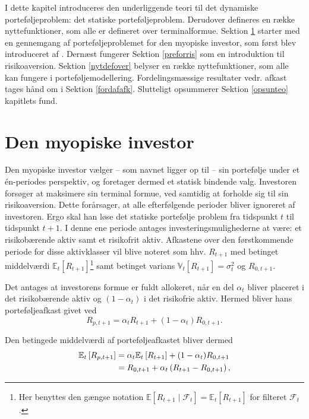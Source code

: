\documentclass[
  a4paper,
  oneside]{memoir}
\begin{document}
I dette kapitel introduceres den underliggende teori til det dynamiske porteføljeproblem: det statiske porteføljeproblem. Derudover defineres en række nyttefunktioner, som alle er defineret over terminalformue. Sektion \ref{myoinv} starter med en gennemgang af porteføljeproblemet for den myopiske investor, som først blev introduceret af \citep{Markowitz1952}. Dernæst fungerer Sektion \ref{preforris} som en introduktion til risikoaversion. Sektion \ref{nytdefover} belyser en række nyttefunktioner, som alle kan fungere i porteføljemodellering. Fordelingsmæssige resultater vedr. afkast tages hånd om i Sektion \ref{fordafafk}. Slutteligt opsummerer Sektion \ref{opsunteo} kapitlets fund.

\hypertarget{myoinv}{%
\section{Den myopiske investor}\label{myoinv}}

Den myopiske investor vælger -- som navnet ligger op til -- sin portefølje under et én-periodes perspektiv, og foretager dermed et statisk bindende valg. Investoren forsøger at maksimere sin terminal formue, ved samtidig at forholde sig til sin risikoaversion. Dette forårsager, at alle efterfølgende perioder bliver ignoreret af investoren. Ergo skal han løse det statiske portefølje problem fra tidspunkt \(t\) til tidspunkt \(t+1\). I denne ene periode antages investeringsmulighederne at være: et risikobærende aktiv samt et risikofrit aktiv. Afkastene over den førstkommende periode for disse aktivklasser vil blive noteret som hhv. \(R_{t+1}\) med betinget middelværdi \(\mathbb{E}_t\left[R_{t+1}\right]\)\footnote{Her benyttes den gængse notation \(\mathbb{E}\left[R_{t+1}\mid \mathcal{F}_t\right]=\mathbb{E}_t\left[R_{t+1}\right]\) for filteret \(\mathcal{F}_t\).} samt betinget varians \(\mathbb{V}_t\left[R_{t+1}\right]=\sigma_t^2\) og \(R_{0,t+1}\).

Det antages at investorens formue er fuldt allokeret, når en del \(\alpha_t\) bliver placeret i det risikobærende aktiv og \((1-\alpha_t)\) i det risikofrie aktiv. Hermed bliver hans porteføljeafkast givet ved
\begin{equation}
R_{p,t+1}=\alpha_t R_{t+1}+\left(1-\alpha_t\right)R_{0,t+1}.\label{eq:Portafk}
\end{equation}

Den betingede middelværdi af porteføljeafkastet bliver dermed
\begin{align}
\mathbb{E}_t\left[R_{p,t+1}\right]&=\alpha_t\mathbb{E}_t\left[R_{t+1}\right]+(1-\alpha_t)R_{0,t+1} \notag\\ 
&=R_{0,t+1}+ \alpha_t\left(R_{t+1} - R_{0,t+1}\right),\label{eq:Forvport}
\end{align}
\end{document}
